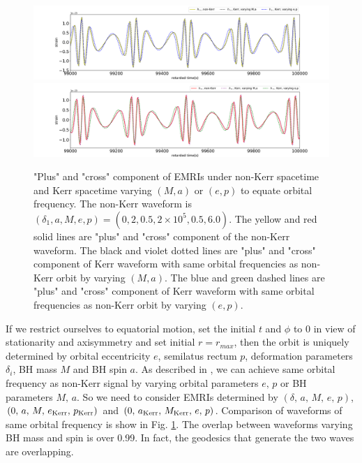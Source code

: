 \documentclass{article}
\begin{document}
\begin{figure}[!ht]
	\centering
	\includegraphics[width=16cm]{eg1.pdf}
	\includegraphics[width=16cm]{eg2.pdf}
	\caption{"Plus" and "cross" component of EMRIs under non-Kerr spacetime and Kerr spacetime varying $(M,a)$ or $(e,p)$ to equate orbital frequency. The non-Kerr waveform is $(\delta_1,a,M,e,p)=(0,2,0.5,2\times10^5, 0.5,6.0)$. The yellow and red solid lines are "plus" and "cross" component of the non-Kerr waveform. The black and violet dotted lines are "plus" and "cross" component of Kerr waveform with same orbital frequencies as non-Kerr orbit by varying $(M,a)$. The blue and green dashed lines are "plus" and "cross" component of Kerr waveform with same orbital frequencies as non-Kerr orbit by varying $(e,p)$.}
	\label{kkwave}
\end{figure}	

If we restrict ourselves to equatorial motion, set the initial $t$ and $\phi$ to 0 in view of stationarity and axisymmetry and set initial $r=r_{max}$, then the orbit is uniquely determined by orbital eccentricity $e$, semilatus rectum $p$, deformation parameters $\delta_i$, BH mass $M$ and BH spin $a$. As described in \cite{majorPRD}, we can achieve same orbital frequency as non-Kerr signal by varying orbital parameters $e, \,p$ or BH parameters $M, \, a$. So we need to consider EMRIs determined by $(\delta,\, a,\, M,\, e,\, p)$, $(0,\, a,\, M,\, e_{\rm{Kerr}},\, p_{\rm{Kerr}})$ and $(0,\, a_{\rm{Kerr}},\, M_{\rm{Kerr}},\, e,\, p)$. Comparison of waveforms of same orbital frequency is show in Fig. \ref{kkwave}. The overlap between waveforms varying BH mass and spin is over 0.99. In fact, the geodesics that generate the two waves are overlapping.  
\end{document}
